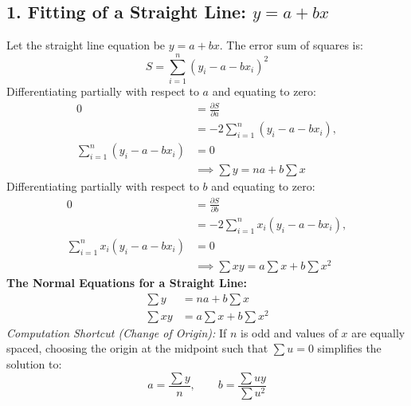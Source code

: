 \documentclass[12pt,a4paper]{article}
\begin{document}
\subsection{1. Fitting of a Straight Line: $y = a + bx$}
\begin{tcolorbox}[examplebox, title={\textbf{Derivation of Normal Equations for a Straight Line}}]
Let the straight line equation be $y = a + bx$. The error sum of squares is:
\begin{equation}
  S = \sum_{i=1}^n (y_i - a - bx_i)^2
\end{equation}
Differentiating partially with respect to $a$ and equating to zero:
\begin{align}
  0 &= \frac{\partial S}{\partial a} \nonumber \\
    &= -2\sum_{i=1}^n (y_i-a-bx_i), \nonumber \\
  \sum_{i=1}^n (y_i-a-bx_i) &= 0 \nonumber \\[3pt]
                                &\implies \sum y = n a + b \sum x
\end{align}
Differentiating partially with respect to $b$ and equating to zero:
\begin{align}
  0 &= \frac{\partial S}{\partial b} \nonumber \\
    &= -2\sum_{i=1}^n x_i (y_i-a-bx_i), \nonumber \\
  \sum_{i=1}^n x_i (y_i-a-bx_i) &= 0 \nonumber \\[3pt]
                                &\implies \sum x y = a \sum x + b \sum x^2
\end{align}
\textbf{The Normal Equations for a Straight Line:}
\begin{align}
  \sum y &= n a + b \sum x \\[3pt]
  \sum x y &= a \sum x + b \sum x^2
\end{align}
\textit{Computation Shortcut (Change of Origin):} If $n$ is odd and values of $x$ are equally spaced, choosing the origin at the midpoint such that $\sum u = 0$ simplifies the solution to:
\begin{equation}
  a = \frac{\sum y}{n}, \qquad b = \frac{\sum u y}{\sum u^2}
\end{equation}
\end{tcolorbox}
\end{document}
